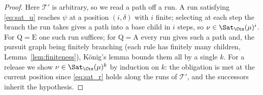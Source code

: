 \begin{proof}
\textit{} Here $\mathcal{T}'$ is arbitrary, so we read a path off a run. A run
satisfying \eqref{eq:sat_u} reaches $\psi$ at a position $(i,\delta)$ with $i$ finite; selecting at
each step the branch the run takes gives a path into a base child in $i$ steps, so
$\nu\in\Sat_{\Ctx}(\mu)^{i}$. For $\mathrm{Q}=\mathrm{E}$ one such run suffices; for
$\mathrm{Q}=\mathrm{A}$ every run gives such a path and, the pursuit graph being finitely branching
(each rule has finitely many children, Lemma~\ref{lem:finiteness}), K\"onig's lemma bounds them all by
a single $k$. For a release we show $\nu\in\Sat_{\Ctx}(\mu)^{k}$ by induction on $k$: the obligation
is met at the current position since \eqref{eq:sat_r} holds along the runs of $\mathcal{T}'$, and the
successors inherit the hypothesis.
\end{proof}

